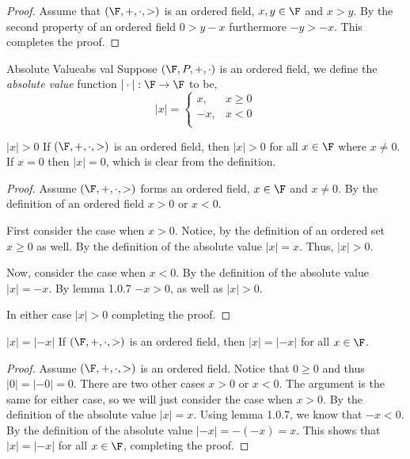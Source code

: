 \documentclass{report}
\begin{document}
\begin{proof}
  Assume that $\left(\F, +, \cdot, >\right)$ is an ordered field, $x, y \in \F$ and $x > y$.
  By the second property of an ordered field $0 > y - x$ furthermore $-y > -x$.
  This completes the proof.
\end{proof}


\begin{definition}{Absolute Value}{abs val}
  Suppose $\left(\F, P, +, \cdot\right)$ is an ordered field, we define the \emph{absolute value} function $|\cdot|: \F \rightarrow \F$ to be,
  $$|x| = \begin{cases}
      x,  & x \geq 0 \\
      -x, & x < 0    \\
    \end{cases}$$
\end{definition}


\begin{proposition}{$|x| > 0$}{}
  If $\left(\F, +, \cdot, >\right)$ is an ordered field,
  then $|x| > 0$ for all $x \in \F$ where $x \neq 0$.
  If $x = 0$ then $|x| = 0$, which is clear from the definition.
\end{proposition}

\begin{proof}
  Assume $\left(\F, +, \cdot, >\right)$ forms an ordered field, $x \in \F$ and $x \neq 0$.
  By the definition of an ordered field $x > 0$ or $x < 0$.

  First consider the case when $x > 0$.
  Notice, by the definition of an ordered set $x \geq 0$ as well.
  By the definition of the absolute value $|x| = x$.
  Thus, $|x| > 0$.

  Now, consider the case when $x < 0$.
  By the definition of the absolute value $|x| = -x$.
  By lemma 1.0.7 $-x > 0$, as well as $|x| > 0$.

  In either case $|x| > 0$ completing the proof.
\end{proof}

\begin{proposition}{$|x| = |-x|$}{}
  If $\left(\F, +, \cdot, >\right)$ is an ordered field,
  then $|x| = |-x|$ for all $x \in \F$.
\end{proposition}

\begin{proof}
  Assume $\left(\F, +, \cdot, >\right)$ is an ordered field.
  Notice that $0 \geq 0$ and thus $|0| = |-0| = 0$.
  There are two other cases $x > 0$ or $x < 0$.
  The argument is the same for either case, so we will just consider the case when $x > 0$.
  By the definition of the absolute value $|x| = x$.
  Using lemma 1.0.7, we know that $-x < 0$.
  By the definition of the absolute value $|-x| = -(-x) = x$.
  This shows that $|x| = |-x|$ for all $x \in \F$, completing the proof.
\end{proof}
\end{document}
